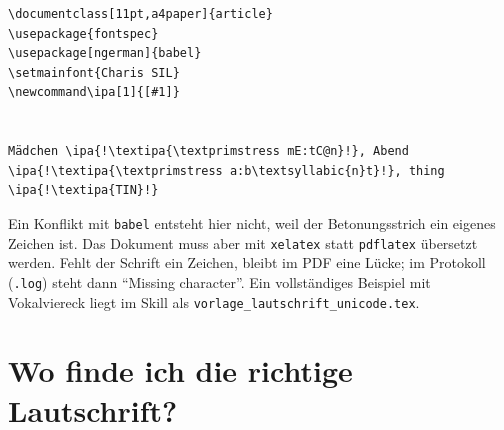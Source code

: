 \begin{lstlisting}[style=latex, escapechar=!]
\documentclass[11pt,a4paper]{article}
\usepackage{fontspec}
\usepackage[ngerman]{babel}
\setmainfont{Charis SIL}
\newcommand\ipa[1]{[#1]}


Mädchen \ipa{!\textipa{\textprimstress mE:tC@n}!}, Abend \ipa{!\textipa{\textprimstress a:b\textsyllabic{n}t}!}, thing \ipa{!\textipa{TIN}!}

\end{lstlisting}

Ein Konflikt mit \texttt{babel} entsteht hier nicht, weil der Betonungsstrich ein eigenes Zeichen ist. Das Dokument muss aber mit \texttt{xelatex} statt \texttt{pdflatex} übersetzt werden. Fehlt der Schrift ein Zeichen, bleibt im PDF eine Lücke; im Protokoll (\texttt{.log}) steht dann \enquote{Missing character}. Ein vollständiges Beispiel mit Vokalviereck liegt im Skill als \texttt{vorlage\_lautschrift\_unicode.tex}.



\section{Wo finde ich die richtige Lautschrift?}

